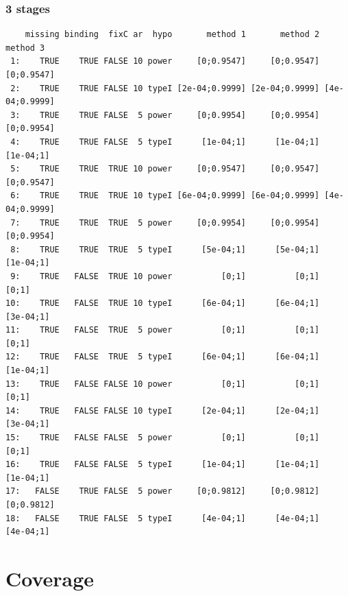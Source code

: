 \documentclass[12pt]{article}
\begin{document}
\subsubsection{3 stages}
\label{sec:orge2f50c4}
\begin{verbatim}
    missing binding  fixC ar  hypo       method 1       method 2       method 3
 1:    TRUE    TRUE FALSE 10 power     [0;0.9547]     [0;0.9547]     [0;0.9547]
 2:    TRUE    TRUE FALSE 10 typeI [2e-04;0.9999] [2e-04;0.9999] [4e-04;0.9999]
 3:    TRUE    TRUE FALSE  5 power     [0;0.9954]     [0;0.9954]     [0;0.9954]
 4:    TRUE    TRUE FALSE  5 typeI      [1e-04;1]      [1e-04;1]      [1e-04;1]
 5:    TRUE    TRUE  TRUE 10 power     [0;0.9547]     [0;0.9547]     [0;0.9547]
 6:    TRUE    TRUE  TRUE 10 typeI [6e-04;0.9999] [6e-04;0.9999] [4e-04;0.9999]
 7:    TRUE    TRUE  TRUE  5 power     [0;0.9954]     [0;0.9954]     [0;0.9954]
 8:    TRUE    TRUE  TRUE  5 typeI      [5e-04;1]      [5e-04;1]      [1e-04;1]
 9:    TRUE   FALSE  TRUE 10 power          [0;1]          [0;1]          [0;1]
10:    TRUE   FALSE  TRUE 10 typeI      [6e-04;1]      [6e-04;1]      [3e-04;1]
11:    TRUE   FALSE  TRUE  5 power          [0;1]          [0;1]          [0;1]
12:    TRUE   FALSE  TRUE  5 typeI      [6e-04;1]      [6e-04;1]      [1e-04;1]
13:    TRUE   FALSE FALSE 10 power          [0;1]          [0;1]          [0;1]
14:    TRUE   FALSE FALSE 10 typeI      [2e-04;1]      [2e-04;1]      [3e-04;1]
15:    TRUE   FALSE FALSE  5 power          [0;1]          [0;1]          [0;1]
16:    TRUE   FALSE FALSE  5 typeI      [1e-04;1]      [1e-04;1]      [1e-04;1]
17:   FALSE    TRUE FALSE  5 power     [0;0.9812]     [0;0.9812]     [0;0.9812]
18:   FALSE    TRUE FALSE  5 typeI      [4e-04;1]      [4e-04;1]      [4e-04;1]
\end{verbatim}

\clearpage 


\section{Coverage}
\label{sec:orgdf359e2}
\end{document}
